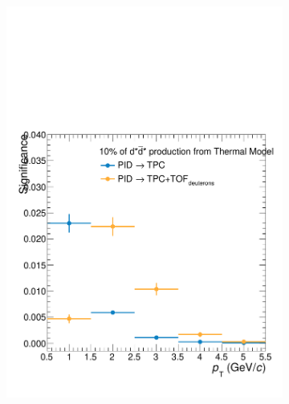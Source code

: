 \begin{figure}
\begin{subfigure}{.33\textwidth}
  \centering
  \captionsetup{justification=centering}
  \includegraphics[width=\linewidth]{gfx/sig_0}
  \caption{}
  \label{fig:tem01}
\end{subfigure}%
\begin{subfigure}{.33\textwidth}
  \centering
  \captionsetup{justification=centering}

\end{subfigure}
\end{figure}
